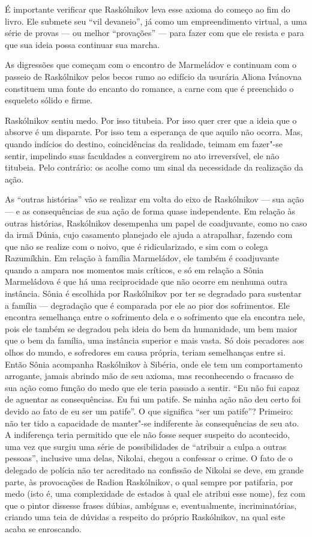É importante verificar que Raskólnikov leva esse axioma do começo ao fim
do livro. Ele submete seu ``vil devaneio'', já como um empreendimento
virtual, a uma série de provas --- ou melhor ``provações'' --- para fazer
com que ele resista e para que sua ideia possa continuar sua marcha.

As digressões que começam com o encontro de Marmeládov e continuam com o
passeio de Raskólnikov pelos becos rumo ao edifício da usurária Aliona
Ivánovna constituem uma fonte do encanto do romance, a carne com que é
preenchido o esqueleto sólido e firme.

Raskólnikov sentiu medo. Por isso titubeia. Por isso quer crer que a
ideia que o absorve é um disparate. Por isso tem a esperança de que
aquilo não ocorra. Mas, quando indícios do destino, coincidências da
realidade, teimam em fazer"-se sentir, impelindo suas faculdades a
convergirem no ato irreversível, ele não titubeia. Pelo contrário: os
acolhe como um sinal da necessidade da realização da ação.

As ``outras histórias'' vão se realizar em volta do eixo de Raskólnikov
--- sua ação --- e as consequências de sua ação de forma quase
independente. Em relação às outras histórias, Raskólnikov desempenha um
papel de coadjuvante, como no caso da irmã Dúnia, cujo casamento
planejado ele ajuda a atrapalhar, fazendo com que não se realize com o
noivo, que é ridicularizado, e sim com o colega Razumíkhin. Em relação à
família Marmeládov, ele também é coadjuvante quando a ampara nos
momentos mais críticos, e só em relação a Sônia Marmeládova é que há uma
reciprocidade que não ocorre em nenhuma outra instância. Sônia é
escolhida por Raskólnikov por ter se degradado para sustentar a família
--- degradação que é comparada por ele ao pior dos sofrimentos. Ele
encontra semelhança entre o sofrimento dela e o sofrimento que ela
encontra nele, pois ele também se degradou pela ideia do bem da
humanidade, um bem maior que o bem da família, uma instância superior e
mais vasta. Só dois pecadores aos olhos do mundo, e sofredores em causa
própria, teriam semelhanças entre si. Então Sônia acompanha Raskólnikov
à Sibéria, onde ele tem um comportamento arrogante, jamais abrindo mão
de seu axioma, mas reconhecendo o fracasso de sua ação como função do
medo que ele teria passado a sentir. ``Eu não fui capaz de aguentar as
consequências. Eu fui um patife. Se minha ação não deu certo foi devido
ao fato de eu ser um patife''. O que significa ``ser um patife''?
Primeiro: não ter tido a capacidade de manter"-se indiferente às
consequências de seu ato. A indiferença teria permitido que ele não
fosse sequer suspeito do acontecido, uma vez que surgiu uma série de
possibilidades de ``atribuir a culpa a outras pessoas'', inclusive uma
delas, Nikolai, chegou a confessar o crime. O fato de o delegado de
polícia não ter acreditado na confissão de Nikolai se deve, em grande
parte, às provocações de Radion Raskólnikov, o qual sempre por
patifaria, por medo (isto é, uma complexidade de estados à qual ele
atribui esse nome), fez com que o pintor dissesse frases dúbias,
ambíguas e, eventualmente, incriminatórias, criando uma teia de dúvidas
a respeito do próprio Raskólnikov, na qual este acaba se enroscando.

